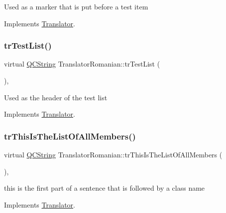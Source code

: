 Used as a marker that is put before a test item 

Implements \mbox{\hyperlink{class_translator}{Translator}}.

\mbox{\label{class_translator_romanian_adc5ecc9a13d79ff232598c986996e429}} 
\subsubsection{\texorpdfstring{trTestList()}{trTestList()}}
{\footnotesize\ttfamily virtual \mbox{\hyperlink{class_q_c_string}{Q\+C\+String}} Translator\+Romanian\+::tr\+Test\+List (\begin{DoxyParamCaption}{ }\end{DoxyParamCaption})\hspace{0.3cm}{\ttfamily [inline]}, {\ttfamily [virtual]}}

Used as the header of the test list 

Implements \mbox{\hyperlink{class_translator}{Translator}}.

\mbox{\label{class_translator_romanian_a14f0edfa3a3a423690aebb8730441204}} 
\subsubsection{\texorpdfstring{trThisIsTheListOfAllMembers()}{trThisIsTheListOfAllMembers()}}
{\footnotesize\ttfamily virtual \mbox{\hyperlink{class_q_c_string}{Q\+C\+String}} Translator\+Romanian\+::tr\+This\+Is\+The\+List\+Of\+All\+Members (\begin{DoxyParamCaption}{ }\end{DoxyParamCaption})\hspace{0.3cm}{\ttfamily [inline]}, {\ttfamily [virtual]}}

this is the first part of a sentence that is followed by a class name 

Implements \mbox{\hyperlink{class_translator}{Translator}}.

\mbox{\label{class_translator_romanian_a10fdbb644a9d11975faad59dd27542d4}} 
